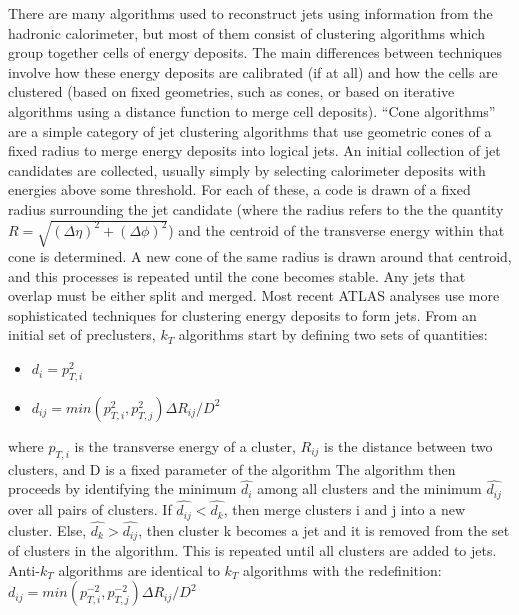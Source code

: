 There are many algorithms used to reconstruct jets using information from the hadronic calorimeter, but most of them consist of clustering algorithms which group together cells of energy deposits.
The main differences between techniques involve how these energy deposits are calibrated (if at all) and how the cells are clustered (based on fixed geometries, such as cones, or based on iterative algorithms using a distance function to merge cell deposits).
``Cone algorithms'' are a simple category of jet clustering algorithms that use geometric cones of a fixed radius to merge energy deposits into logical jets.
An initial collection of jet candidates are collected, usually simply by selecting calorimeter deposits with energies above some threshold.
For each of these, a code is drawn of a fixed radius surrounding the jet candidate (where the radius refers to the the quantity $R = \sqrt{(\Delta \eta)^2 + (\Delta \phi)^2}$) and the centroid of the transverse energy within that cone is determined.
A new cone of the same radius is drawn around that centroid, and this processes is repeated until the cone becomes stable.
Any jets that overlap must be either split and merged.
Most recent ATLAS analyses use more sophisticated techniques for clustering energy deposits to form jets.
From an initial set of preclusters, $k_T$ algorithms start by defining two sets of quantities:
\begin{itemize}
\item $d_{i} = p_{T,i}^2$
\item $d_{ij} = min(p_{T,i}^2, p_{T,j}^2)\Delta R_{ij} / D^2$
\end{itemize}
where $p_{T,i}$ is the transverse energy of a cluster, $R_{ij}$ is the distance between two clusters, and D is a fixed parameter of the algorithm 
The algorithm then proceeds by identifying the minimum $\hat{d_{i}}$ among all clusters and the minimum $\hat{d_{ij}}$ over all pairs of clusters.
If $\hat{d_{ij}} < \hat{d_{k}}$, then merge clusters i and j into a new cluster.
Else, $\hat{d_{k}} > \hat{d_{ij}}$, then cluster k becomes a jet and it is removed from the set of clusters in the algorithm.
This is repeated until all clusters are added to jets.
Anti-$k_T$ algorithms are identical to $k_T$ algorithms with the redefinition: $d_{ij} = min(p_{T,i}^{-2}, p_{T,j}^{-2})\Delta R_{ij} / D^2$



